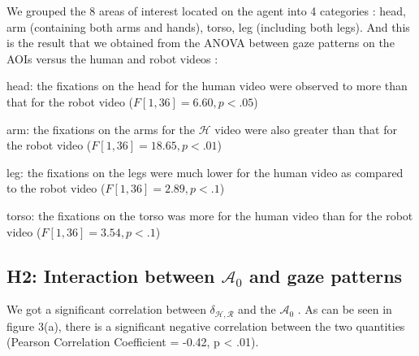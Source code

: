 \documentclass[lettersize, apacite, twoside, HRI]{apa_HRI}
\newcommand{\anti}{{$\mathcal{A}_0$ }}
\begin{document}
We grouped the 8 areas of interest located on the agent into 4 categories : {\sf
head}, {\sf arm} (containing both arms and hands), {\sf torso}, {\sf leg}
(including both legs). And this is the result that we obtained from the ANOVA
between gaze patterns on the AOIs versus the human and robot videos :

{\sf head}: the fixations on the head for the human video
were observed to more than that for the robot video ($F[1,36] = 6.60, p < .05$)

{\sf arm}: the fixations on the arms for the $\mathcal{H}$ video
were also greater than that for the robot video ($F[1,36] = 18.65, p < .01$)

{\sf leg}: the fixations on the legs were much lower
for the human video as compared to the robot video ($F[1,36] = 2.89, p < .1$)

{\sf torso}: the fixations on the torso was more for the
human video than for the robot video ($F[1,36] = 3.54, p < .1$) 

\subsection{H2: Interaction between \anti and gaze patterns}

We got a significant correlation between $\delta_{\mathcal{H},\mathcal{R}}$ and
the \anti. As can be seen in figure 3(a), there is a significant negative
correlation between the two quantities (Pearson Correlation Coefficient = -0.42,
p < .01).
\end{document}
